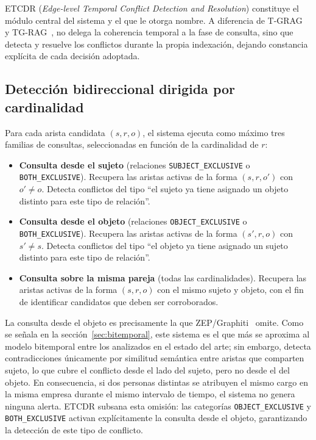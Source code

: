 ETCDR (\emph{Edge-level Temporal Conflict Detection and Resolution}) constituye el módulo central del sistema y el que le otorga nombre. A diferencia de T-GRAG~\cite{tgrag2025} y TG-RAG~\cite{tg_rag2025}, no delega la coherencia temporal a la fase de consulta, sino que detecta y resuelve los conflictos durante la propia indexación, dejando constancia explícita de cada decisión adoptada.

\subsection{Detección bidireccional dirigida por cardinalidad}

Para cada arista candidata $(s, r, o)$, el sistema ejecuta como máximo tres familias de consultas, seleccionadas en función de la cardinalidad de $r$:

\begin{itemize}
    \item \textbf{Consulta desde el sujeto} (relaciones \texttt{SUBJECT\_EXCLUSIVE} o \texttt{BOTH\_EXCLUSIVE}). Recupera las aristas activas de la forma $(s, r, o')$ con $o' \neq o$. Detecta conflictos del tipo ``el sujeto ya tiene asignado un objeto distinto para este tipo de relación''.
    \item \textbf{Consulta desde el objeto} (relaciones \texttt{OBJECT\_EXCLUSIVE} o \texttt{BOTH\_EXCLUSIVE}). Recupera las aristas activas de la forma $(s', r, o)$ con $s' \neq s$. Detecta conflictos del tipo ``el objeto ya tiene asignado un sujeto distinto para este tipo de relación''.
    \item \textbf{Consulta sobre la misma pareja} (todas las cardinalidades). Recupera las aristas activas de la forma $(s, r, o)$ con el mismo sujeto y objeto, con el fin de identificar candidatos que deben ser corroborados.
\end{itemize}

La consulta desde el objeto es precisamente la que ZEP/Graphiti~\cite{zep2025} omite. Como se señala en la sección~\ref{sec:bitemporal}, este sistema es el que más se aproxima al modelo bitemporal entre los analizados en el estado del arte; sin embargo, detecta contradicciones únicamente por similitud semántica entre aristas que comparten sujeto, lo que cubre el conflicto desde el lado del sujeto, pero no desde el del objeto. En consecuencia, si dos personas distintas se atribuyen el mismo cargo en la misma empresa durante el mismo intervalo de tiempo, el sistema no genera ninguna alerta. ETCDR subsana esta omisión: las categorías \texttt{OBJECT\_EXCLUSIVE} y \texttt{BOTH\_EXCLUSIVE} activan explícitamente la consulta desde el objeto, garantizando la detección de este tipo de conflicto.

